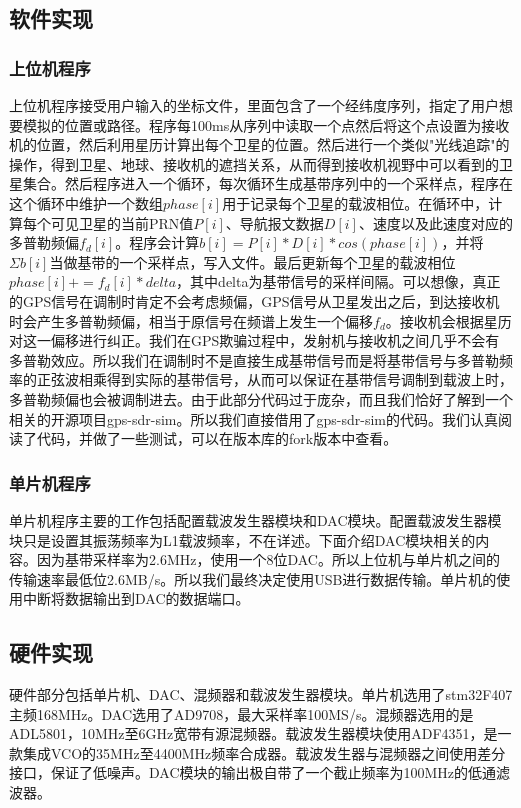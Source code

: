 \documentclass[UTF8,titlepage]{ctexart}
\begin{document}
\subsection*{软件实现}
\subsubsection*{上位机程序}
上位机程序接受用户输入的坐标文件，里面包含了一个经纬度序列，指定了用户想要模拟的位置或路径。程序每100ms从序列中读取一个点然后将这个点设置为接收机的位置，然后利用星历计算出每个卫星的位置。然后进行一个类似"光线追踪"的操作，得到卫星、地球、接收机的遮挡关系，从而得到接收机视野中可以看到的卫星集合。然后程序进入一个循环，每次循环生成基带序列中的一个采样点，程序在这个循环中维护一个数组$phase[i]$用于记录每个卫星的载波相位。在循环中，计算每个可见卫星的当前PRN值$P[i]$、导航报文数据$D[i]$、速度以及此速度对应的多普勒频偏$f_d[i]$。程序会计算$b[i]=P[i]*D[i]*cos(phase[i])$，并将$\Sigma b[i]$当做基带的一个采样点，写入文件。最后更新每个卫星的载波相位$phase[i]+=f_d[i]*delta$，其中delta为基带信号的采样间隔。可以想像，真正的GPS信号在调制时肯定不会考虑频偏，GPS信号从卫星发出之后，到达接收机时会产生多普勒频偏，相当于原信号在频谱上发生一个偏移$f_d$。接收机会根据星历对这一偏移进行纠正。我们在GPS欺骗过程中，发射机与接收机之间几乎不会有多普勒效应。所以我们在调制时不是直接生成基带信号而是将基带信号与多普勒频率的正弦波相乘得到实际的基带信号，从而可以保证在基带信号调制到载波上时，多普勒频偏也会被调制进去。由于此部分代码过于庞杂，而且我们恰好了解到一个相关的开源项目gps-sdr-sim\cite{gpsSdrSim}。所以我们直接借用了gps-sdr-sim的代码。我们认真阅读了代码，并做了一些测试，可以在版本库的fork版本\cite{gpsSdrSimFork}中查看。
\subsubsection*{单片机程序}
单片机程序主要的工作包括配置载波发生器模块和DAC模块。配置载波发生器模块只是设置其振荡频率为L1载波频率，不在详述。下面介绍DAC模块相关的内容。因为基带采样率为2.6MHz，使用一个8位DAC。所以上位机与单片机之间的传输速率最低位2.6MB/s。所以我们最终决定使用USB进行数据传输。单片机的使用中断将数据输出到DAC的数据端口。
\subsection*{硬件实现}
硬件部分包括单片机、DAC、混频器和载波发生器模块。单片机选用了stm32F407 主频168MHz。DAC选用了AD9708，最大采样率100MS/s。混频器选用的是ADL5801，10MHz至6GHz宽带有源混频器。载波发生器模块使用ADF4351，是一款集成VCO的35MHz至4400MHz频率合成器。载波发生器与混频器之间使用差分接口，保证了低噪声。DAC模块的输出极自带了一个截止频率为100MHz的低通滤波器。
\end{document}
